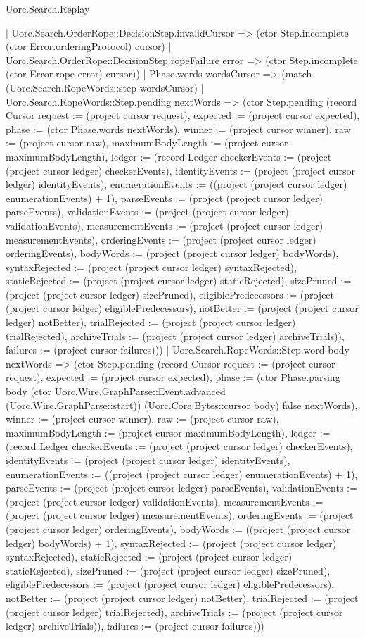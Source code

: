 \begin{lexlean}{Uorc.Search.Replay}
\begin{semanticmodule}
{      | Uorc.Search.OrderRope::DecisionStep.invalidCursor => (ctor Step.incomplete (ctor Error.orderingProtocol) cursor)
      | Uorc.Search.OrderRope::DecisionStep.ropeFailure error => (ctor Step.incomplete (ctor Error.rope error) cursor))
    | Phase.words wordsCursor => (match (Uorc.Search.RopeWords::step wordsCursor)
      | Uorc.Search.RopeWords::Step.pending nextWords => (ctor Step.pending (record Cursor {request := (project cursor request), expected := (project cursor expected), phase := (ctor Phase.words nextWords), winner := (project cursor winner), raw := (project cursor raw), maximumBodyLength := (project cursor maximumBodyLength), ledger := (record Ledger {checkerEvents := (project (project cursor ledger) checkerEvents), identityEvents := (project (project cursor ledger) identityEvents), enumerationEvents := ((project (project cursor ledger) enumerationEvents) + 1), parseEvents := (project (project cursor ledger) parseEvents), validationEvents := (project (project cursor ledger) validationEvents), measurementEvents := (project (project cursor ledger) measurementEvents), orderingEvents := (project (project cursor ledger) orderingEvents), bodyWords := (project (project cursor ledger) bodyWords), syntaxRejected := (project (project cursor ledger) syntaxRejected), staticRejected := (project (project cursor ledger) staticRejected), sizePruned := (project (project cursor ledger) sizePruned), eligiblePredecessors := (project (project cursor ledger) eligiblePredecessors), notBetter := (project (project cursor ledger) notBetter), trialRejected := (project (project cursor ledger) trialRejected), archiveTrials := (project (project cursor ledger) archiveTrials)}), failures := (project cursor failures)}))
      | Uorc.Search.RopeWords::Step.word body nextWords => (ctor Step.pending (record Cursor {request := (project cursor request), expected := (project cursor expected), phase := (ctor Phase.parsing body (ctor Uorc.Wire.GraphParse::Event.advanced (Uorc.Wire.GraphParse::start)) (Uorc.Core.Bytes::cursor body) false nextWords), winner := (project cursor winner), raw := (project cursor raw), maximumBodyLength := (project cursor maximumBodyLength), ledger := (record Ledger {checkerEvents := (project (project cursor ledger) checkerEvents), identityEvents := (project (project cursor ledger) identityEvents), enumerationEvents := ((project (project cursor ledger) enumerationEvents) + 1), parseEvents := (project (project cursor ledger) parseEvents), validationEvents := (project (project cursor ledger) validationEvents), measurementEvents := (project (project cursor ledger) measurementEvents), orderingEvents := (project (project cursor ledger) orderingEvents), bodyWords := ((project (project cursor ledger) bodyWords) + 1), syntaxRejected := (project (project cursor ledger) syntaxRejected), staticRejected := (project (project cursor ledger) staticRejected), sizePruned := (project (project cursor ledger) sizePruned), eligiblePredecessors := (project (project cursor ledger) eligiblePredecessors), notBetter := (project (project cursor ledger) notBetter), trialRejected := (project (project cursor ledger) trialRejected), archiveTrials := (project (project cursor ledger) archiveTrials)}), failures := (project cursor failures)}))
}
\end{semanticmodule}
\end{lexlean}
